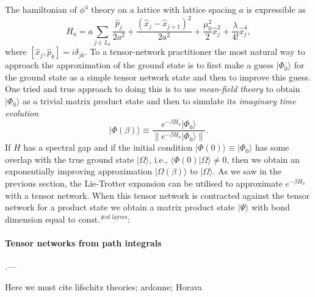 \documentclass[prl,twocolumn,lengthcheck,superscriptaddress]{revtex4-1}
\theoremstyle{definition}
\theoremstyle{remark}
\begin{document}
The hamiltonian of $\phi^4$ theory on a lattice with lattice spacing $a$ is expressible as 
\begin{equation}
	H_a = a\sum_{j\in L_a} \frac{\widehat{p}_j}{2a^{2}} + \frac{(\widehat{x}_j-\widehat{x}_{j+1})^2}{2a^2} + \frac{\mu_0^2}{2} \widehat{x}_j^2 + \frac{\lambda}{4!} \widehat{x}_j^4,
\end{equation}
where $[\widehat{x}_j, \widehat{p}_k] = i\delta_{jk}$. To a tensor-network practitioner the most natural way to approach the approximation of the ground state is to first make a guess $|\Phi_0\rangle$ for the ground state as a simple tensor network state and then to improve this guess. One tried and true approach to doing this is to use \emph{mean-field theory} to obtain $|\Phi_0\rangle$ as a trivial matrix product state and then to simulate its \emph{imaginary time evolution} 
\begin{equation}
	|\Phi(\beta)\rangle \equiv \frac{e^{-\beta H_a}|\Phi_0\rangle}{\|e^{-\beta H_a}|\Phi_0\rangle\|}.
\end{equation}
If $H$ has a spectral gap and if the initial condition $|\Phi(0)\rangle \equiv |\Phi_0\rangle$ has some overlap with the true ground state $|\Omega\rangle$, i.e., $\langle \Phi(0)|\Omega\rangle \not= 0$, then we obtain an exponentially improving approximation $|\Omega(\beta)\rangle$ to $|\Omega\rangle$.
As we saw in the previous section, the Lie-Trotter expansion can be utilised to approximate $e^{-\beta H_a}$  with a tensor network. When this tensor network is contracted against the tensor network for a product state we obtain a matrix product state $|\Psi\rangle$ with bond dimension equal to $\text{const.}^{\text{\# of layers}}$:


\paragraph{Tensor networks from path integrals}\hspace{-1em}.---

Here we must cite lifschitz theories; ardonne; Horava
\end{document}
